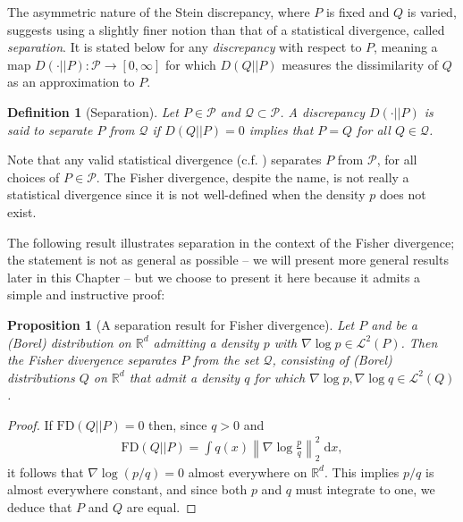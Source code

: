 \documentclass[12pt,paper=letter]{scrreprt}
\newtheorem{proposition}{Proposition}[chapter]
\newtheorem{definition}{Definition}[chapter]
\begin{document}
The asymmetric nature of the Stein discrepancy, where $P$ is fixed and $Q$ is varied, suggests using a slightly finer notion than that of a statistical divergence, called \emph{separation}.
It is stated below for any \emph{discrepancy} with respect to $P$, meaning a map $D(\cdot || P) : \mathcal{P} \rightarrow [0,\infty]$ for which $D(Q || P)$ measures the dissimilarity of $Q$ as an approximation to $P$.

\begin{definition}[Separation]
\label{def: separating}
    Let $P \in \mathcal{P}$ and $\mathcal{Q} \subset \mathcal{P}$.
    A discrepancy $D(\cdot || P)$ is said to \emph{separate $P$ from $\mathcal{Q}$} if $D(Q||P) = 0$ implies that $P = Q$ for all $Q \in \mathcal{Q}$.
\end{definition}

\noindent Note that any valid statistical divergence (c.f. ) separates $P$ from $\mathcal{P}$, for all choices of $P \in \mathcal{P}$.
The Fisher divergence, despite the name, is not really a statistical divergence since it is not well-defined when the density $p$ does not exist.

The following result illustrates separation in the context of the Fisher divergence; the statement is not as general as possible -- we will present more general results later in this Chapter -- but we choose to present it here because it admits a simple and instructive proof:

\begin{proposition}[A separation result for Fisher divergence]
    Let $P$ and be a (Borel) distribution on $\mathbb{R}^d$ admitting a density $p$ with $\nabla \log p \in \mathcal{L}^2(P)$.
    Then the Fisher divergence separates $P$ from the set $\mathcal{Q}$, consisting of (Borel) distributions $Q$ on $\mathbb{R}^d$ that admit a density $q$ for which $\nabla \log p, \nabla \log q \in \mathcal{L}^2(Q)$.
\end{proposition}
\begin{proof}
    If $\mathrm{FD}(Q||P) = 0$ then, since $q > 0$ and
    \begin{align*}
        \mathrm{FD}(Q||P) = \int q(x) \left\| \nabla \log \frac{p}{q} \right\|_2^2 \; \mathrm{d}x ,
    \end{align*}
    it follows that $\nabla \log (p/q) = 0$ almost everywhere on $\mathbb{R}^d$.
    This implies $p/q$ is almost everywhere constant, and since both $p$ and $q$ must integrate to one, we deduce that $P$ and $Q$ are equal.
\end{proof}
\end{document}
